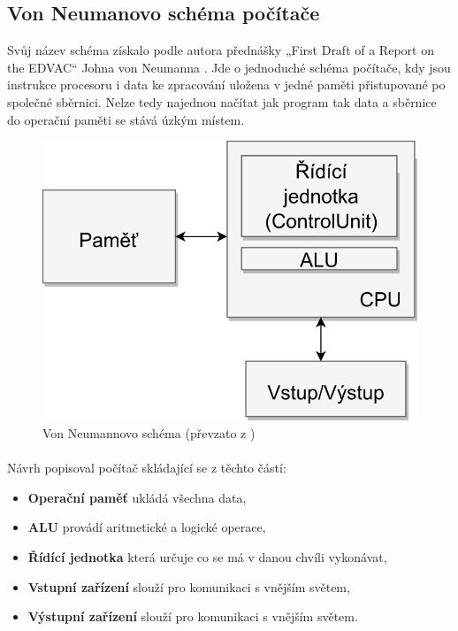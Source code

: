 \documentclass[FM,BP]{tulthesis}
\begin{document}
\subsection{Von Neumanovo schéma počítače} \label{kap:Von Neumanovo schéma počítače}
Svůj název schéma získalo podle autora přednášky „First Draft of a Report on the EDVAC“ Johna von Neumanna \cite{First_Draft}. Jde o jednoduché schéma počítače, kdy jsou instrukce procesoru i data ke zpracování uložena v jedné paměti přistupované po společné sběrnici. Nelze tedy najednou načítat jak program tak data a sběrnice do operační paměti se stává úzkým místem. \cite{VNEUM}

\begin{figure}[h]
    \includegraphics[scale=0.8]{assets/Von_Neumann_Architecture.png}
    \centering
    \caption{Von Neumannovo schéma (převzato z \cite{Schema_pc})}
    \label{img:VonNeumann}
\end{figure}

\paragraph{}
Návrh popisoval počítač skládající se z těchto částí:
\begin{itemize}
    \item \textbf{Operační paměť} ukládá všechna data,
    \item \textbf{ALU} provádí aritmetické a logické operace,
    \item \textbf{Řídící jednotka} která určuje co se má v danou chvíli vykonávat,
    \item \textbf{Vstupní zařízení} slouží pro komunikaci s vnějším světem,
    \item \textbf{Výstupní zařízení} slouží pro komunikaci s vnějším světem.
\end{itemize}
\end{document}
